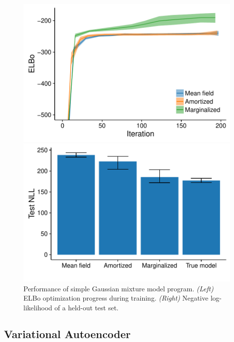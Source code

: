 \begin{figure}[!ht]
\begin{minipage}{0.5\linewidth}
\centering
\includegraphics[width=\linewidth]{figs/results/gmm/elboProgress.pdf}
\end{minipage}
%
\begin{minipage}{0.5\linewidth}
\centering
\includegraphics[width=\linewidth]{figs/results/gmm/nll.pdf}
\end{minipage}
\caption{Performance of simple Gaussian mixture model program. \emph{(Left)} ELBo optimization progress during training. \emph{(Right)} Negative log-likelihood of a held-out test set.}
\label{fig:gmmResults}
\end{figure}



\subsection{Variational Autoencoder}
\label{sec:results_vae}

